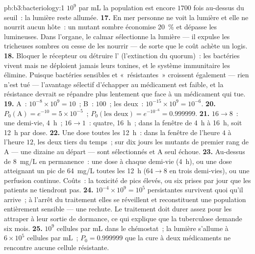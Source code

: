 \begin{solution}{pb:b3:bacteriology:1}
$10^{9}$ par mL la population est encore $1700$ fois au-dessus du
seuil~: la lumière reste allumée.
\textbf{17.} En mer personne ne voit la lumière et elle ne nourrit aucun
hôte~: un mutant sombre économise \qty{20}{\%} et dépasse les
lumineuses. Dans l'organe, le calmar sélectionne la lumière --- il
expulse les tricheuses sombres ou cesse de les nourrir --- de sorte que
le coût achète un logis.
\textbf{18.} Bloquer le récepteur ou détruire l'
(l'extinction du quorum)~: les bactéries vivent mais ne déploient
jamais leurs toxines, et le système immunitaire les élimine. Puisque
bactéries sensibles et «~résistantes~» croissent également --- rien
n'est tué --- l'avantage sélectif d'échapper au médicament est faible,
et la résistance devrait se répandre plus lentement que face à un
médicament qui tue.
\textbf{19.} A~: $10^{-8}\times 10^{9} = 10$~; B~: $100$~; les deux~:
$10^{-15}\times
10^{9} = 10^{-6}$.
\textbf{20.} $P_{0}(\text{A}) = e^{-10} = 5\times 10^{-5}$~;
$P_{0}(\text{les deux}) = e^{-10^{-6}} = 0.999999$.
\textbf{21.} $16 \to 8$~: une demi-vie, \qty{4}{h}~; $16 \to 1$~:
quatre, \qty{16}{h}~; dans la fenêtre de \qty{4}{h} à \qty{16}{h}, soit
\qty{12}{h} par dose.
\textbf{22.} Une dose toutes les \qty{12}{h}~: dans la fenêtre de
l'heure $4$ à l'heure $12$, les deux tiers du temps~; sur dix jours
les mutants de premier rang de A --- une dizaine au départ --- sont
sélectionnés et A seul échoue.
\textbf{23.} Au-dessus de \qty{8}{mg/L} en permanence~: une dose à
chaque demi-vie (\qty{4}{h}), ou une dose atteignant un pic de
\qty{64}{mg/L} toutes les \qty{12}{h} ($64 \to 8$ en trois demi-vies),
ou une perfusion continue. Coûts~: la toxicité de pics élevés, ou six
prises par jour que les patients ne tiendront pas.
\textbf{24.} $10^{-4}\times 10^{9} = 10^{5}$ persistantes survivent quoi
qu'il arrive~; à l'arrêt du traitement elles se réveillent et
reconstituent une population entièrement sensible --- une rechute. Le
traitement doit durer assez pour les attraper à leur sortie de
dormance, ce qui explique que la tuberculose demande six mois.
\textbf{25.} $10^{9}$ cellules par mL dans le chémostat~; la lumière
s'allume à $6\times 10^{5}$ cellules par mL~; $P_{0} = 0.999999$ que la
cure à deux médicaments ne rencontre aucune cellule résistante.
\end{solution}
